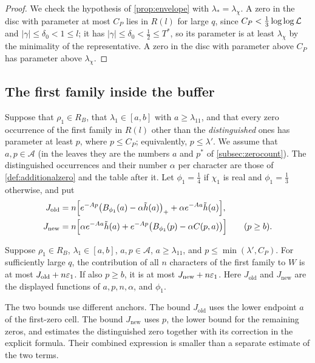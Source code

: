 \begin{proof}
We check the hypothesis of \cref{prop:envelope} with $\lambda_*=\lambda_\chi$. A zero in the disc
with parameter at most $C_P$ lies in $R(l)$ for large $q$, since $C_P<\frac13\log\log\mathcal{L}$ and
$|\gamma|\le\delta_0<1\le l$; it has $|\gamma|\le\delta_0<\frac12\le T^*$, so its parameter is at least
$\lambda_\chi$ by the minimality of the representative. A zero in the disc with parameter
above $C_P$ has parameter above $\lambda_\chi$.
\end{proof}

\subsection{The first family inside the buffer}\label{subsec:firstinside}
Suppose that $\rho_1\in R_B$, that $\lambda_1\in[a,b]$ with $a\ge\lambda_{11}$, and that every zero
occurrence of the first family in $R(l)$ other than the \emph{distinguished} ones has parameter at
least $p$, where $p\le C_P$; equivalently, $p\le\lambda'$. We assume that $a,p\in\mathcal A$ (in the leaves they are
the numbers $a$ and $p^*$ of \cref{subsec:zerocount}). The distinguished occurrences and their
number $\alpha$ per character are those of \cref{def:additionalzero} and the table after it. Let $\phi_1=\frac14$ if $\chi_1$ is real and $\phi_1=\frac13$ otherwise, and put
\begin{align*}
  J_{\mathrm{old}}&=n\Bigl[e^{-Ap}\bigl(B_{\phi_1}(a)-\alpha\tilde h(a)\bigr)_++\alpha e^{-Aa}\tilde h(a)\Bigr],\\
  J_{\mathrm{new}}&=n\Bigl[\alpha e^{-Aa}\tilde h(a)+e^{-Ap}\bigl(B_{\phi_1}(p)-\alpha C(p,a)\bigr)\Bigr]
  \qquad(p\ge b).
\end{align*}

\begin{proposition}\label{prop:firstinside}
Suppose $\rho_1\in R_B$, $\lambda_1\in[a,b]$, $a,p\in\mathcal A$,
$a\ge\lambda_{11}$, and $p\le\min(\lambda',C_P)$.
For sufficiently large $q$, the contribution of all $n$ characters of the first family
to $W$ is at most $J_{\mathrm{old}}+n\varepsilon_1$. If also $p\ge b$, it is at most
$J_{\mathrm{new}}+n\varepsilon_1$. Here $J_{\mathrm{old}}$ and $J_{\mathrm{new}}$ are the displayed
functions of $a,p,n,\alpha$, and $\phi_1$.
\end{proposition}

The two bounds use different anchors. The bound $J_{\mathrm{old}}$ uses the lower endpoint
$a$ of the first-zero cell. The bound $J_{\mathrm{new}}$ uses $p$, the lower bound for the
remaining zeros, and estimates the distinguished zero together with its correction in
the explicit formula. Their combined expression is smaller than a separate estimate
of the two terms.

